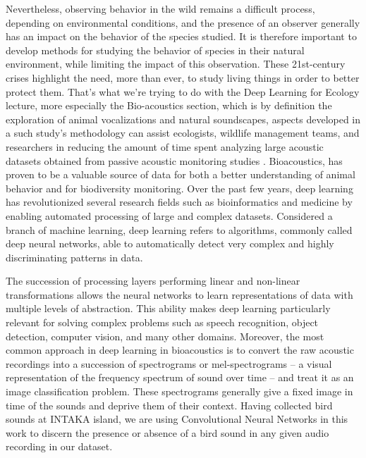 \documentclass[conference]{IEEEtran}
\begin{document}
 Nevertheless, observing behavior in the wild remains a difficult process, depending on environmental conditions, and the presence of an observer generally has an impact on the behavior of the species studied.   It is therefore important to develop methods for studying the behavior of species in their natural environment, while limiting the impact of this observation\cite{jeantet2021identification}. These 21st-century crises highlight the need, more than ever,
to study living things in order to better protect them. That's what we're trying to do with the Deep Learning for Ecology lecture, more especially the Bio-acoustics section, which is by definition  the exploration of animal vocalizations and natural soundscapes\cite{jeantet2020behavioural}, aspects developed in a such study's methodology can assist ecologists, wildlife management teams, and researchers in reducing the amount of time spent analyzing large acoustic datasets obtained from passive acoustic monitoring studies \cite[p.2]{jeantet2023improving}. Bioacoustics, has proven to be a valuable source of data for both a better understanding of animal behavior and for biodiversity monitoring. Over the past few years, deep learning has revolutionized several
	research fields such as bioinformatics  and medicine by enabling automated processing of large and
	complex datasets. Considered a branch of machine learning, deep
	learning refers to algorithms, commonly called deep neural networks,
	able to automatically detect very complex and highly discriminating
	patterns in data\cite{jeantet2023improving}.
	
	The succession of processing layers
	performing linear and non-linear transformations allows the neural
	networks to learn representations of data with multiple levels of
	abstraction. This ability makes deep learning
	particularly relevant for solving complex problems such as speech
	recognition, object detection, computer vision, and many other domains. Moreover, the most common
	approach in deep learning in bioacoustics is to convert the raw acoustic
	recordings into a succession of spectrograms or mel-spectrograms – a
	visual representation of the frequency spectrum of sound over time – and
	treat it as an image classification problem. These spec­trograms generally give a fixed image in time of the sounds and deprive them of their context\cite{jeantet2023improving}.
Having collected bird sounds at INTAKA island, we are using Convolutional Neural Networks in this work to discern the presence or absence of a bird sound in any given audio recording in our  dataset.
\end{document}
